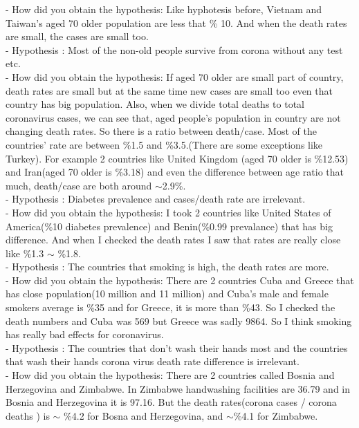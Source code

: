 \documentclass[a4 paper]{article}
\numberwithin{equation}{section}
\newcommand{\0}{\mathbf{0}}
\begin{document}
\begin{itemize}
- How did you obtain the hypothesis: Like hyphotesis before, Vietnam and Taiwan's aged 70 older population are less that \% 10. And when the death rates are small, the cases are small too. 
\newline \\
- Hypothesis : Most of the non-old people survive from corona without any test etc.\\
- How did you obtain the hypothesis: If aged 70 older are small part of country, death rates are small but at the same time new cases are small too even that country has big population. Also, when we divide total deaths to total coronavirus cases, we can see that, aged people's population in country are not changing death rates. 
So there is a ratio between death/case. Most of the countries' rate are between \%1.5 and \%3.5.(There are some exceptions like Turkey). For example 2 countries like United Kingdom (aged 70 older is \%12.53) and Iran(aged 70 older is \%3.18) and even the difference between age ratio that much, death/case are both around $\sim$2.9\%.
\newline \\
- Hypothesis : Diabetes prevalence and cases/death rate are irrelevant.\\
- How did you obtain the hypothesis: I took 2 countries like United States of America(\%10 diabetes prevalence) and Benin(\%0.99 prevalance) that has big difference. And when I checked the death rates I saw that rates are really close like \%1.3 $\sim$ \%1.8.
\newline\\
- Hypothesis : The countries that smoking is high, the death rates are more. \\
- How did you obtain the hypothesis: There are 2 countries Cuba and Greece that has close population(10 million and 11 million) and Cuba's male and female smokers average is \%35 and for Greece, it is more than \%43. So I checked the death numbers and Cuba was 569 but Greece was sadly 9864. So I think smoking has really bad effects for coronavirus.
\newline\\
- Hypothesis : The countries that don't wash their hands most and the countries that wash their hands corona virus death rate difference is irrelevant. \\
- How did you obtain the hypothesis: There are 2 countries called Bosnia and Herzegovina and Zimbabwe. In Zimbabwe handwashing facilities are 36.79 and in Bosnia and Herzegovina it is 97.16. But the death rates(corona cases / corona deaths ) is $\sim$ \%4.2 for Bosna and Herzegovina, and $\sim$\%4.1 for Zimbabwe.
\newline\\
	
	
\end{itemize}
\end{document}
